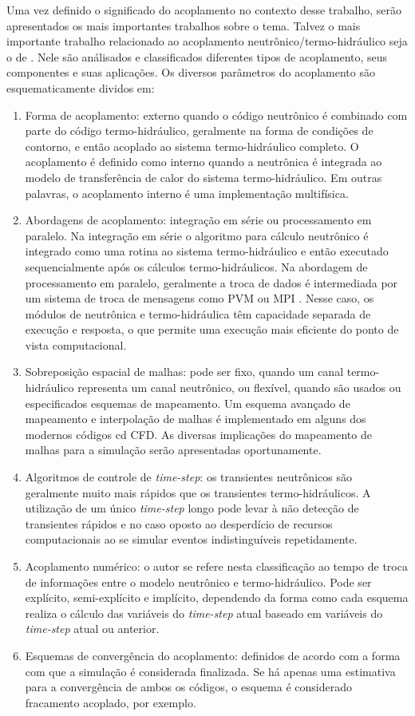 Uma vez definido o significado do acoplamento no contexto desse trabalho, serão apresentados os mais importantes 
trabalhos sobre o tema. Talvez o mais importante trabalho relacionado ao acoplamento 
neutrônico/termo-hidráulico seja o de \cite{Ivanov2007}. Nele são análisados e classificados diferentes tipos de 
acoplamento, seus componentes e suas aplicações. Os diversos parâmetros do acoplamento são esquematicamente dividos em: 
\begin{enumerate}
\item Forma de acoplamento: externo quando o código neutrônico é combinado com parte do código termo-hidráulico, 
geralmente na forma de condições de contorno, e então acoplado ao sistema termo-hidráulico completo. O acoplamento 
é definido como interno quando a neutrônica é integrada ao modelo de transferência de calor do sistema termo-hidráulico. 
Em outras palavras, o acoplamento interno é uma implementação multifísica.
\item Abordagens de acoplamento: integração em série ou processamento em paralelo. Na integração em série o algoritmo 
para cálculo neutrônico é integrado como uma rotina ao sistema termo-hidráulico e então executado sequencialmente 
após os cálculos termo-hidráulicos. Na abordagem de processamento em paralelo, geralmente a troca de dados é 
intermediada por um sistema de troca de mensagens como PVM \cite{Geist94} ou MPI \cite{Quinn2004}. Nesse caso, os 
módulos de neutrônica e termo-hidráulica têm capacidade separada de execução e resposta, o que permite uma execução 
mais eficiente do ponto de vista computacional.
\item Sobreposição espacial de malhas: pode ser fixo, quando um canal termo-hidráulico representa um canal neutrônico, 
ou flexível, quando são usados ou especificados esquemas de mapeamento. Um esquema avançado de mapeamento 
e interpolação de malhas \cite{Beaudoin2008} é implementado em alguns dos modernos códigos cd CFD. As diversas implicações 
do mapeamento de malhas para a simulação serão apresentadas oportunamente.
\item Algoritmos de controle de \textit{time-step}: os transientes neutrônicos são geralmente muito mais rápidos que 
os transientes termo-hidráulicos. A utilização de um único \textit{time-step} longo pode levar à não detecção de transientes 
rápidos e no caso oposto ao desperdício de recursos computacionais ao se simular eventos indistinguíveis repetidamente.
\item Acoplamento numérico: o autor se refere nesta classificação ao tempo de troca de informações entre o modelo 
neutrônico e termo-hidráulico. Pode ser explícito, semi-explícito e implícito, dependendo da forma como cada esquema 
realiza o cálculo das variáveis do \textit{time-step} atual baseado em variáveis do \textit{time-step} atual ou 
anterior.
\item Esquemas de convergência do acoplamento: definidos de acordo com a forma com que a simulação é considerada 
finalizada. Se há apenas uma estimativa para a convergência de ambos os códigos, o esquema é considerado fracamento 
acoplado, por exemplo.
\end{enumerate}

